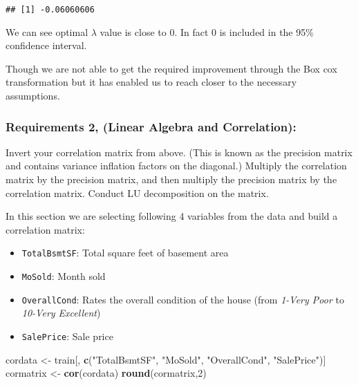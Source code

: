 \documentclass[]{article}
\newenvironment{Shaded}{\begin{snugshade}}{\end{snugshade}}
\newcommand{\DecValTok}[1]{\textcolor[rgb]{0.00,0.00,0.81}{#1}}
\newcommand{\KeywordTok}[1]{\textcolor[rgb]{0.13,0.29,0.53}{\textbf{#1}}}
\newcommand{\NormalTok}[1]{#1}
\newcommand{\StringTok}[1]{\textcolor[rgb]{0.31,0.60,0.02}{#1}}
\providecommand{\tightlist}{%
  \setlength{\itemsep}{0pt}\setlength{\parskip}{0pt}}
\begin{document}
\begin{verbatim}
## [1] -0.06060606
\end{verbatim}

We can see optimal \(\lambda\) value is close to 0. In fact 0 is
included in the 95\% confidence interval.

Though we are not able to get the required improvement through the Box
cox transformation but it has enabled us to reach closer to the
necessary assumptions.

\hypertarget{requirements-2-linear-algebra-and-correlation}{%
\subsubsection{Requirements 2, (Linear Algebra and
Correlation):}\label{requirements-2-linear-algebra-and-correlation}}

Invert your correlation matrix from above. (This is known as the
precision matrix and contains variance inflation factors on the
diagonal.) Multiply the correlation matrix by the precision matrix, and
then multiply the precision matrix by the correlation matrix. Conduct LU
decomposition on the matrix.

In this section we are selecting following 4 variables from the data and
build a correlation matrix:

\begin{itemize}
\tightlist
\item
  \texttt{TotalBsmtSF}: Total square feet of basement area
\item
  \texttt{MoSold}: Month sold
\item
  \texttt{OverallCond}: Rates the overall condition of the house (from
  \emph{1-Very Poor} to \emph{10-Very Excellent})
\item
  \texttt{SalePrice}: Sale price
\end{itemize}

\begin{Shaded}
\begin{Highlighting}[]
\NormalTok{cordata <-}\StringTok{ }\NormalTok{train[, }\KeywordTok{c}\NormalTok{(}\StringTok{"TotalBsmtSF"}\NormalTok{, }\StringTok{"MoSold"}\NormalTok{, }\StringTok{"OverallCond"}\NormalTok{, }\StringTok{"SalePrice"}\NormalTok{)]}
\NormalTok{cormatrix <-}\StringTok{ }\KeywordTok{cor}\NormalTok{(cordata)}
\KeywordTok{round}\NormalTok{(cormatrix,}\DecValTok{2}\NormalTok{)}
\end{Highlighting}
\end{Shaded}
\end{document}
